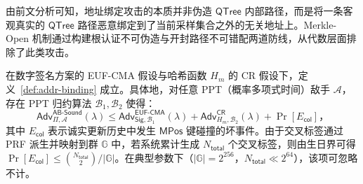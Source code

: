 由前文分析可知，地址绑定攻击的本质并非伪造 $\mathsf{QTree}$ 内部路径，而是将一条客观真实的 $\mathsf{QTree}$ 路径恶意绑定到了当前采样集合之外的无关地址上。Merkle-Open 机制通过构建根认证不可伪造与开封路径不可错配两道防线，从代数层面排除了此类攻击。

\begin{proposition}[地址绑定健全性]\label{prop:ab-sound}
在数字签名方案的 EUF-CMA 假设与哈希函数 $H_m$ 的 CR 假设下，定义~\ref{def:addr-binding} 成立。具体地，对任意 PPT（概率多项式时间）敌手 $\mathcal{A}$，存在 PPT 归约算法 $\mathcal{B}_1,\mathcal{B}_2$ 使得：
\begin{equation}\label{eq:ab-sound-bound}
\mathsf{Adv}_{\Pi,\mathcal{A}}^{\mathsf{AB\text{-}Sound}}(\lambda)\le
\mathsf{Adv}_{\mathsf{Sig},\mathcal{B}_1}^{\mathsf{EUF\text{-}CMA}}(\lambda)+
\mathsf{Adv}_{H_m,\mathcal{B}_2}^{\mathsf{CR}}(\lambda)+
\Pr[E_{\mathsf{col}}]\text{，}
\end{equation}
其中 $E_{\mathsf{col}}$ 表示诚实更新历史中发生 $\mathsf{MPos}$ 键碰撞的坏事件。由于交叉标签通过 PRF 派生并映射到群 $\mathbb{G}$ 中，若系统累计生成 $N_{\mathsf{total}}$ 个交叉标签，则由生日界可得 $\Pr[E_{\mathsf{col}}] \le \binom{N_{\mathsf{total}}}{2}/|\mathbb{G}|$。在典型参数下（$|\mathbb{G}|=2^{256}$，$N_{\mathsf{total}}\ll 2^{64}$），该项可忽略不计。
\end{proposition}

